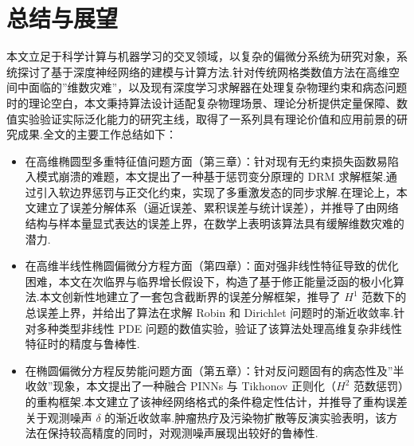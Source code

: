 \chapter{总结与展望}
本文立足于科学计算与机器学习的交叉领域，以复杂的偏微分系统为研究对象，系统探讨了基于深度神经网络的建模与计算方法.针对传统网格类数值方法在高维空间中面临的”维数灾难”，以及现有深度学习求解器在处理复杂物理约束和病态问题时的理论空白，本文秉持算法设计适配复杂物理场景、理论分析提供定量保障、数值实验验证实际泛化能力的研究主线，取得了一系列具有理论价值和应用前景的研究成果.全文的主要工作总结如下：
\begin{itemize}
    \item 在高维椭圆型多重特征值问题方面（第三章）：针对现有无约束损失函数易陷入模式崩溃的难题，本文提出了一种基于惩罚变分原理的 DRM 求解框架.通过引入软边界惩罚与正交化约束，实现了多重激发态的同步求解.在理论上，本文建立了误差分解体系（逼近误差、累积误差与统计误差），并推导了由网络结构与样本量显式表达的误差上界，在数学上表明该算法具有缓解维数灾难的潜力.
    \item 在高维半线性椭圆偏微分方程方面（第四章）：面对强非线性特征导致的优化困难，本文在次临界与临界增长假设下，构造了基于修正能量泛函的极小化算法.本文创新性地建立了一套包含截断界的误差分解框架，推导了 $H^1$ 范数下的总误差上界，并给出了算法在求解 Robin 和 Dirichlet 问题时的渐近收敛率.针对多种类型非线性 PDE 问题的数值实验，验证了该算法处理高维复杂非线性特征时的精度与鲁棒性.
    \item 在椭圆偏微分方程反势能问题方面（第五章）：针对反问题固有的病态性及”半收敛”现象，本文提出了一种融合 PINNs 与 Tikhonov 正则化（$H^2$ 范数惩罚）的重构框架.本文建立了该神经网络格式的条件稳定性估计，并推导了重构误差关于观测噪声 $\delta$ 的渐近收敛率.肿瘤热疗及污染物扩散等反演实验表明，该方法在保持较高精度的同时，对观测噪声展现出较好的鲁棒性.
\end{itemize}

